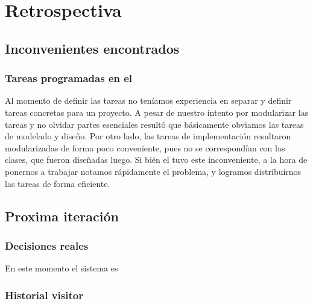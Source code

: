 \section{Retrospectiva}
  \subsection{Inconvenientes encontrados}
    \subsubsection{Tareas programadas en el \sprintback{}}
      Al momento de definir las tareas no ten\'iamos experiencia en separar y definir
      tareas concretas para un proyecto. A pesar de nuestro intento por modularizar
      las tareas y no olvidar partes esenciales result\'o que b\'asicamente obviamos
      las tareas de modelado y dise\~no. Por otro lado, las tareas de implementaci\'on
      resultaron modularizadas de forma poco conveniente, pues no se correspond\'ian
      con las clases, que fueron dise\~nadas luego. Si bi\'en el \sprintback{} tuvo
      este inconveniente, a la hora de ponernos a trabajar notamos r\'apidamente
      el problema, y logramos distribuirnos las tareas de forma eficiente.

    \subsection{Proxima iteraci\'on}

      \subsubsection{Decisiones reales}
        En este momento el sistema es 

      \subsubsection{Historial visitor}

